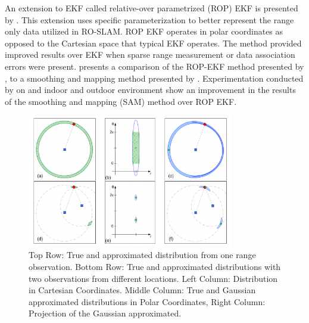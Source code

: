 \documentclass[conference]{IEEEtran}
\begin{document}
	
	
	
	
	
	
	
	
	An extension to EKF called relative-over parametrized (ROP) EKF is presented by \cite{Djugash2008}. This extension uses specific parameterization to  better represent the range only data utilized in RO-SLAM. ROP EKF operates in polar coordinates as opposed to the Cartesian space that typical EKF operates. The method provided improved results over EKF when sparse range measurement or data association errors were present. \cite{Herranz2014} presents a comparison of the ROP-EKF method presented by \cite{Djugash2008}, to a smoothing and mapping method presented by \cite{Dellaert2006}. Experimentation conducted by \cite{Herranz2014} on and indoor and outdoor environment show an improvement in the results of the smoothing and mapping (SAM) method over ROP EKF.
	
	\begin{figure}[h!]
		
		\centering
		
		\includegraphics[width=90mm]{ROP_djugash.png}
		
		\caption{Top Row: True and approximated distribution from one range observation. Bottom Row: True and approximated distributions with two observations from different locations. Left Column: Distribution in Cartesian Coordinates. Middle Column: True and Gaussian approximated distributions in Polar Coordinates, Right Column: Projection of the Gaussian approximated. \cite{Djugash2008}} 
		
		\label{ROP_djugash}
		
	\end{figure}
	
\end{document}
